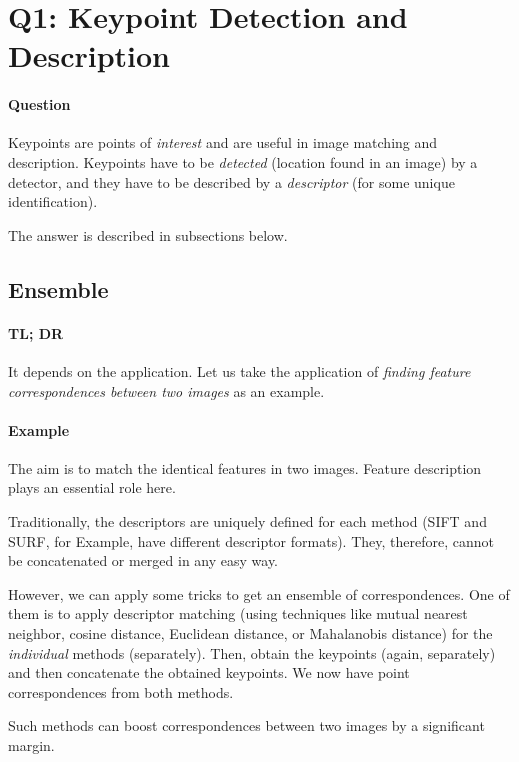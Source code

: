
\section{Q1: Keypoint Detection and Description}

\paragraph*{Question}
\begin{displayquote}
    
\end{displayquote}

Keypoints are points of \emph{interest} and are useful in image matching and description. Keypoints have to be \emph{detected} (location found in an image) by a detector, and they have to be described by a \emph{descriptor} (for some unique identification).

The answer is described in subsections below.





\subsection{Ensemble}

\paragraph*{TL; DR}
It depends on the application. Let us take the application of \emph{finding feature correspondences between two images} as an example.

\paragraph*{Example}

The aim is to match the identical features in two images. Feature description plays an essential role here.

Traditionally, the descriptors are uniquely defined for each method (SIFT and SURF, for Example, have different descriptor formats). They, therefore, cannot be concatenated or merged in any easy way. 

However, we can apply some tricks to get an ensemble of correspondences. One of them is to apply descriptor matching (using techniques like mutual nearest neighbor, cosine distance, Euclidean distance, or Mahalanobis distance) for the \emph{individual} methods (separately). Then, obtain the keypoints (again, separately) and then concatenate the obtained keypoints. We now have point correspondences from both methods.

Such methods can boost correspondences between two images by a significant margin.
